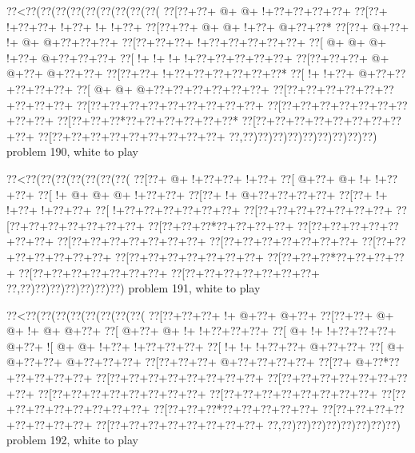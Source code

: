 \vbox{\vbox{\goo
\0??<\0??(\0??(\0??(\0??(\0??(\0??(\0??(\0??(\0??(
\0??[\0??+\0??+\- @+\- @+\- !+\0??+\0??+\0??+\0??+
\0??[\0??+\- !+\0??+\0??+\- !+\0??+\- !+\- !+\0??+
\0??[\0??+\0??+\- @+\- @+\- !+\0??+\- @+\0??+\0??*
\0??[\0??+\- @+\0??+\- !+\- @+\- @+\0??+\0??+\0??+
\0??[\0??+\0??+\0??+\- !+\0??+\0??+\0??+\0??+\0??+
\0??[\- @+\- @+\- @+\- !+\0??+\- @+\0??+\0??+\0??+
\0??[\- !+\- !+\- !+\- !+\0??+\0??+\0??+\0??+\0??+
\0??[\0??+\0??+\0??+\- @+\- @+\0??+\- @+\0??+\0??+
\0??[\0??+\0??+\- !+\0??+\0??+\0??+\0??+\0??+\0??*
\0??[\- !+\- !+\0??+\- @+\0??+\0??+\0??+\0??+\0??+
\0??[\- @+\- @+\- @+\0??+\0??+\0??+\0??+\0??+\0??+
\0??[\0??+\0??+\0??+\0??+\0??+\0??+\0??+\0??+\0??+
\0??[\0??+\0??+\0??+\0??+\0??+\0??+\0??+\0??+\0??+
\0??[\0??+\0??+\0??+\0??+\0??+\0??+\0??+\0??+\0??+
\0??[\0??+\0??+\0??*\0??+\0??+\0??+\0??+\0??+\0??*
\0??[\0??+\0??+\0??+\0??+\0??+\0??+\0??+\0??+\0??+
\0??[\0??+\0??+\0??+\0??+\0??+\0??+\0??+\0??+\0??+
\0??,\0??)\0??)\0??)\0??)\0??)\0??)\0??)\0??)\0??)
}
\hfil problem 190, white to play\hfil\break
}

\vbox{\vbox{\goo
\0??<\0??(\0??(\0??(\0??(\0??(\0??(\0??(
\0??[\0??+\- @+\- !+\0??+\0??+\- !+\0??+
\0??[\- @+\0??+\- @+\- !+\- !+\0??+\0??+
\0??[\- !+\- @+\- @+\- @+\- !+\0??+\0??+
\0??[\0??+\- !+\- @+\0??+\0??+\0??+\0??+
\0??[\0??+\- !+\- !+\0??+\- !+\0??+\0??+
\0??[\- !+\0??+\0??+\0??+\0??+\0??+\0??+
\0??[\0??+\0??+\0??+\0??+\0??+\0??+\0??+
\0??[\0??+\0??+\0??+\0??+\0??+\0??+\0??+
\0??[\0??+\0??+\0??*\0??+\0??+\0??+\0??+
\0??[\0??+\0??+\0??+\0??+\0??+\0??+\0??+
\0??[\0??+\0??+\0??+\0??+\0??+\0??+\0??+
\0??[\0??+\0??+\0??+\0??+\0??+\0??+\0??+
\0??[\0??+\0??+\0??+\0??+\0??+\0??+\0??+
\0??[\0??+\0??+\0??+\0??+\0??+\0??+\0??+
\0??[\0??+\0??+\0??*\0??+\0??+\0??+\0??+
\0??[\0??+\0??+\0??+\0??+\0??+\0??+\0??+
\0??[\0??+\0??+\0??+\0??+\0??+\0??+\0??+
\0??,\0??)\0??)\0??)\0??)\0??)\0??)\0??)
}
\hfil problem 191, white to play\hfil\break
}

\vbox{\vbox{\goo
\0??<\0??(\0??(\0??(\0??(\0??(\0??(\0??(\0??(
\0??[\0??+\0??+\0??+\- !+\- @+\0??+\- @+\0??+
\0??[\0??+\0??+\- @+\- @+\- !+\- @+\- @+\0??+
\0??[\- @+\0??+\- @+\- !+\- !+\0??+\0??+\0??+
\0??[\- @+\- !+\- !+\0??+\0??+\0??+\- @+\0??+
\- ![\- @+\- @+\- !+\0??+\- !+\0??+\0??+\0??+
\0??[\- !+\- !+\- !+\0??+\0??+\- @+\0??+\0??+
\0??[\- @+\- @+\0??+\0??+\- @+\0??+\0??+\0??+
\0??[\0??+\0??+\0??+\- @+\0??+\0??+\0??+\0??+
\0??[\0??+\- @+\0??*\0??+\0??+\0??+\0??+\0??+
\0??[\0??+\0??+\0??+\0??+\0??+\0??+\0??+\0??+
\0??[\0??+\0??+\0??+\0??+\0??+\0??+\0??+\0??+
\0??[\0??+\0??+\0??+\0??+\0??+\0??+\0??+\0??+
\0??[\0??+\0??+\0??+\0??+\0??+\0??+\0??+\0??+
\0??[\0??+\0??+\0??+\0??+\0??+\0??+\0??+\0??+
\0??[\0??+\0??+\0??*\0??+\0??+\0??+\0??+\0??+
\0??[\0??+\0??+\0??+\0??+\0??+\0??+\0??+\0??+
\0??[\0??+\0??+\0??+\0??+\0??+\0??+\0??+\0??+
\0??,\0??)\0??)\0??)\0??)\0??)\0??)\0??)\0??)
}
\hfil problem 192, white to play\hfil\break
}


